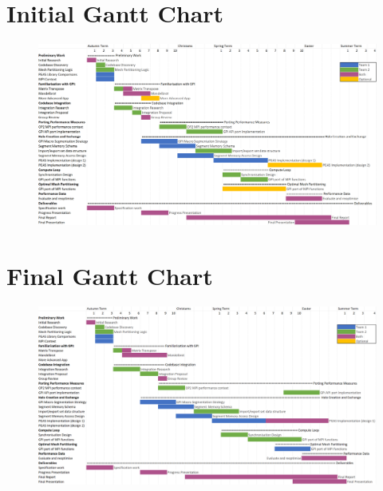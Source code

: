 \newpage
\section{Initial Gantt Chart}\label{appendix:Gantt_chart_original}
\begin{figure}[h!]
    \centering
    \includegraphics[width=0.8\textheight, angle=90]{figures/Gantt_Chart_Original.png}
\end{figure}

\newpage
\section{Final Gantt Chart}\label{appendix:Gantt_chart_new}
\begin{figure}[h!]
    \centering
    \includegraphics[width=0.8\textheight, angle=90]{figures/Gantt_Chart_New.png}
\end{figure}

